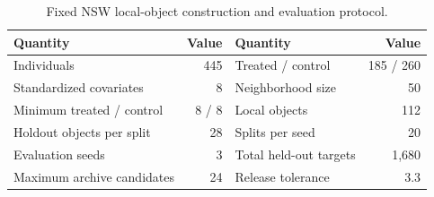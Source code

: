 \begin{table}[H]
\centering
\caption{Fixed NSW local-object construction and evaluation protocol.}
\label{tab:v1-app-nsw-construction}
\begin{tabular}{lr@{\qquad}lr}
\toprule
Quantity & Value & Quantity & Value \\
\midrule
Individuals & 445 & Treated / control & 185 / 260 \\
Standardized covariates & 8 & Neighborhood size & 50 \\
Minimum treated / control & 8 / 8 & Local objects & 112 \\
Holdout objects per split & 28 & Splits per seed & 20 \\
Evaluation seeds & 3 & Total held-out targets & 1,680 \\
Maximum archive candidates & 24 & Release tolerance & 3.3 \\
\bottomrule
\end{tabular}
\end{table}
